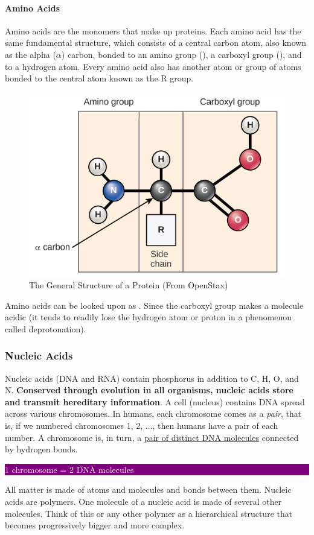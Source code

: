 \documentclass[12pt]{article}
\newcommand{\ctext}[3]{
    \colorbox{#2}{\parbox{0.9\textwidth}{\textcolor{#1}{#3}}}
}
\begin{document}
\paragraph{Amino Acids}
Amino acids are the monomers that make up proteins. Each amino acid has the same fundamental structure, which consists of a central carbon atom, also known as the alpha ($\alpha$) carbon, bonded to an amino group (), a carboxyl group (), and to a hydrogen atom. Every amino acid also has another atom or group of atoms bonded to the central atom known as the R group.

\begin{figure}[h!]
    \centering
    \includegraphics[width=0.5\linewidth]{openstax-protein-general-structure.jpg}
    \caption{The General Structure of a Protein (From OpenStax)}
    \label{fig: protein}
\end{figure}

Amino acids can be looked upon as . Since the carboxyl group makes a molecule acidic (it tends to readily lose the hydrogen atom or proton in a phenomenon called deprotonation).

\subsubsection{Nucleic Acids}
Nucleic acids (DNA and RNA) contain phosphorus in addition to C, H, O, and N. \textbf{Conserved through evolution in all organisms, nucleic acids store and transmit hereditary information}. A cell (nucleus) contains DNA spread across various chromosomes. In humans, each chromosome comes as a \emph{pair}, that is, if we numbered chromosomes 1, 2, $\dots$, then humans have a pair of each number. A chromosome is, in turn, a \href{https://biology.stackexchange.com/a/996/63085}{pair of distinct DNA molecules} connected by hydrogen bonds.


\ctext{white}{purple}{
    1 chromosome = 2 DNA molecules
}

All matter is made of atoms and molecules and bonds between them. Nucleic acids are polymers. One molecule of a nucleic acid is made of several other molecules. Think of this or any other polymer as a hierarchical structure that becomes progressively bigger and more complex.
\end{document}
